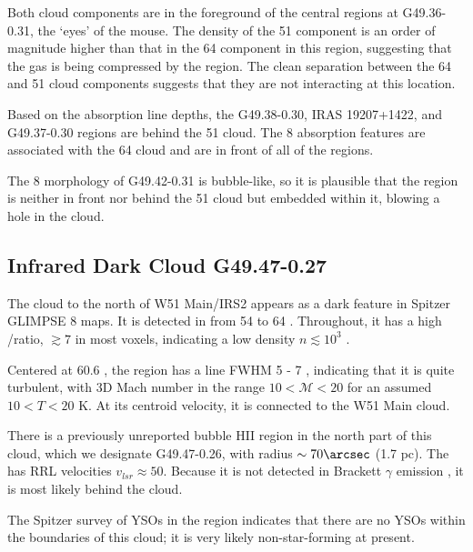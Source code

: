Both cloud components are in the foreground of the central \hii regions at
G49.36-0.31, the `eyes' of the mouse.  The density of the 51 \kms component is
an order of magnitude higher than that in the 64 \kms component in this region,
suggesting that the gas is being compressed by the \hii region.
The clean separation between the 64 and 51 \kms cloud components suggests that
they are not interacting at this location.  

Based on the absorption line depths, the G49.38-0.30, IRAS 19207+1422, and
G49.37-0.30 \hii regions are behind the 51 \kms cloud.  The 8 \um absorption
features are associated with the 64 \kms cloud and are in front of all of the
\hii regions.

The 8 \um morphology of G49.42-0.31 is bubble-like, so it is plausible that the
\hii region is neither in front nor behind the 51 \kms cloud but embedded
within it, blowing a hole in the cloud.

\subsection{Infrared Dark Cloud G49.47-0.27}
The cloud to the north of W51 Main/IRS2 appears as a dark feature in Spitzer
GLIMPSE 8 \um maps.  It is detected in \formaldehyde from 54 to 64
\kms.  Throughout, it has a high \oneone/\twotwo ratio, $\gtrsim7$ in
most voxels, indicating a low density $n\lesssim10^3$ \percc. 


Centered at 60.6 \kms, the region has a line FWHM 5 - 7 \kms, indicating that
it is quite turbulent, with 3D Mach number in the range $10 < \mathcal{M} < 20$
for an assumed $10 < T < 20$ K.  At its centroid velocity, it is connected
to the W51 Main cloud.

There is a previously unreported bubble HII region in the north part of this
cloud, which we designate G49.47-0.26, with radius $\sim70\arcsec$ (1.7 pc).
The \hii has RRL velocities $v_{lsr}\approx50$\kms.  Because it is not detected
in Brackett $\gamma$ emission \citep[from the UWISH2
survey:][]{Froebrich2011a}, it is most likely behind the cloud.

The \citet{Kang2009a} Spitzer survey of YSOs in the region indicates that there
are no YSOs within the boundaries of this cloud; it is very likely
non-star-forming at present.

